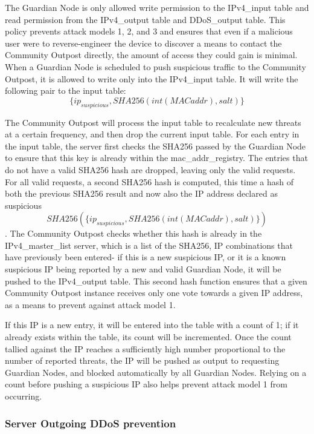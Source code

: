 The Guardian Node is only allowed write permission to the IPv4_input table and read permission from the IPv4_output table and DDoS_output table. This policy prevents attack models 1, 2, and 3 and ensures that even if a malicious user were to reverse-engineer the device to discover a means to contact the Community Outpost directly, the amount of access they could gain is minimal. When a Guardian Node is scheduled to push suspicious traffic to the Community Outpost, it is allowed to write only into the IPv4_input table. It will write the following pair to the input table: \[\{ip_{suspicious}, SHA256(int(MAC addr), salt)\}\] 

The Community Outpost will process the input table to recalculate new threats at a certain frequency, and then drop the current input table. For each entry in the input table, the server first checks the SHA256 passed by the Guardian Node to ensure that this key is already within the mac_addr_registry. The entries that do not have a valid SHA256 hash are dropped, leaving only the valid requests. For all valid requests, a second SHA256 hash is computed, this time a hash of both the previous SHA256 result and now also the IP address declared as suspicious \[SHA256(\{ip_{suspicious}, SHA256(int(MAC addr), salt)\}) \]. The Community Outpost checks whether this hash is already in the IPv4_master_list server, which is a list of the SHA256, IP combinations that have previously been entered- if this is a new suspicious IP, or it is a known suspicious IP being reported by a new and valid Guardian Node, it will be pushed to the IPv4_output table. This second hash function ensures that a given Community Outpost instance receives only one vote towards a given IP address, as a means to prevent against attack model 1. 

If this IP is a new entry, it will be entered into the table with a count of 1; if it already exists within the table, its count will be incremented. Once the count tallied against the IP reaches a sufficiently high number proportional to the number of reported threats, the IP will be pushed as output to requesting Guardian Nodes, and blocked automatically by all Guardian Nodes. Relying on a count before pushing a suspicious IP also helps prevent attack model 1 from occurring. 

\subsubsection{Server Outgoing DDoS prevention}
\label{sec:design:serverddos}


